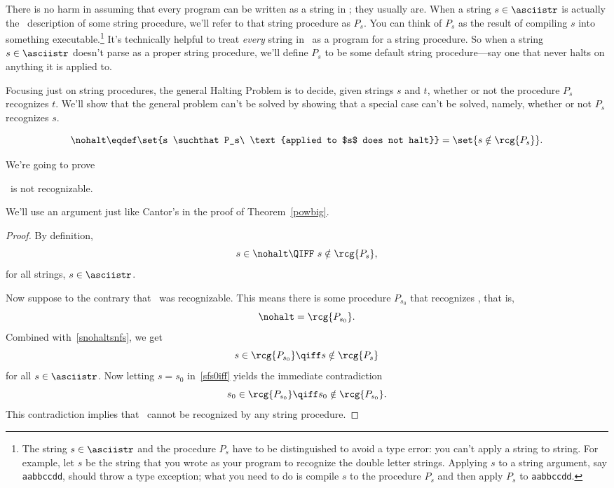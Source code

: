 There is no harm in assuming that every program can be written as a
string in \asciistr; they usually are.  When a string $s \in
\asciistr$ is actually the \asciibet\ description of some string
procedure, we'll refer to that string procedure as $P_s$.  You can
think of $P_s$ as the result of compiling $s$ into something
executable.\footnote{The string $s \in \asciistr$ and the procedure
  $P_s$ have to be distinguished to avoid a type error: you can't
  apply a string to string.  For example, let $s$ be the string that
  you wrote as your program to recognize the double letter strings.
  Applying $s$ to a string argument, say \texttt{aabbccdd}, should
  throw a type exception; what you need to do is compile $s$ to the
  procedure $P_s$ and then apply $P_s$ to \texttt{aabbccdd}.} It's
technically helpful to treat \emph{every} string in \asciistr\ as a
program for a string procedure.  So when a string $s \in \asciistr$
doesn't parse as a proper string procedure, we'll define $P_s$ to be
some default string procedure---say one that never halts on anything
it is applied to.

Focusing just on string procedures, the general Halting Problem is to
decide, given strings $s$ and $t$, whether or not the procedure $P_s$
recognizes $t$.  We'll show that the general problem can't be solved
by showing that a special case can't be solved, namely, whether or not
$P_s$ recognizes $s$.

\begin{definition}\label{nohalt_def}
\begin{equation}\label{nohalt_eqdef}
\nohalt \eqdef \set{s \suchthat P_s\ \text{applied to $s$ does not halt}} = \set{s \notin \rcg{P_s}}.
\end{equation}
\end{definition}
We're going to prove
\begin{theorem}\label{nohalt_thm}
\nohalt\ is not recognizable.
\end{theorem}

We'll use an argument just like Cantor's in the proof of
Theorem~\ref{powbig}.

\begin{proof}
By definition, 
\begin{equation}\label{snohaltsnfs}
s \in \nohalt \QIFF\ s \notin \rcg{P_s},
\end{equation}
for all strings, $s \in \asciistr$.

Now suppose to the contrary that \nohalt\ was recognizable.  This
means there is some procedure $P_{s_0}$ that recognizes \nohalt, that is,
\[
\nohalt = \rcg{P_{s_0}}.
\]
Combined with~\eqref{snohaltsnfs}, we get
\begin{equation}\label{sfs0iff}
s \in \rcg{P_{s_0}} \qiff s \notin \rcg{P_s}
\end{equation}
for all $s \in \asciistr$.  Now letting $s = s_0$ in~\eqref{sfs0iff}
yields the immediate contradiction
\[
s_0 \in \rcg{P_{s_0}} \qiff s_0 \notin \rcg{P_{s_0}}.
\]
This contradiction implies that \nohalt\ cannot be recognized by any
string procedure.
\end{proof}

